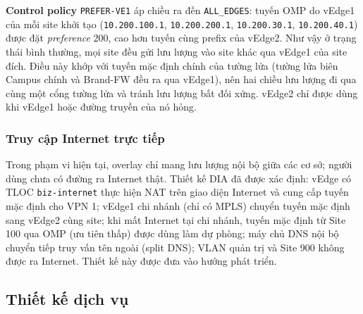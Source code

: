\textbf{Control policy} \texttt{PREFER-VE1} áp chiều ra đến \texttt{ALL\_EDGES}: tuyến OMP do vEdge1 của mỗi site khởi tạo (\texttt{10.200.100.1}, \texttt{10.200.200.1}, \texttt{10.200.30.1}, \texttt{10.200.40.1}) được đặt \textit{preference} 200, cao hơn tuyến cùng prefix của vEdge2. Như vậy ở trạng thái bình thường, mọi site đều gửi lưu lượng vào site khác qua vEdge1 của site đích. Điều này khớp với tuyến mặc định chính của tường lửa (tường lửa biên Campus chính và Brand-FW đều ra qua vEdge1), nên hai chiều lưu lượng đi qua cùng một cổng tường lửa và tránh lưu lượng bất đối xứng. vEdge2 chỉ được dùng khi vEdge1 hoặc đường truyền của nó hỏng.

\subsubsection{Truy cập Internet trực tiếp}

Trong phạm vi hiện tại, overlay chỉ mang lưu lượng nội bộ giữa các cơ sở; người dùng chưa có đường ra Internet thật. Thiết kế DIA đã được xác định: vEdge có TLOC \texttt{biz-internet} thực hiện NAT trên giao diện Internet và cung cấp tuyến mặc định cho VPN 1; vEdge1 chi nhánh (chỉ có MPLS) chuyển tuyến mặc định sang vEdge2 cùng site; khi mất Internet tại chi nhánh, tuyến mặc định từ Site 100 qua OMP (ưu tiên thấp) được dùng làm dự phòng; máy chủ DNS nội bộ chuyển tiếp truy vấn tên ngoài (split DNS); VLAN quản trị và Site 900 không được ra Internet. Thiết kế này được đưa vào hướng phát triển.

\subsection{Thiết kế dịch vụ}

